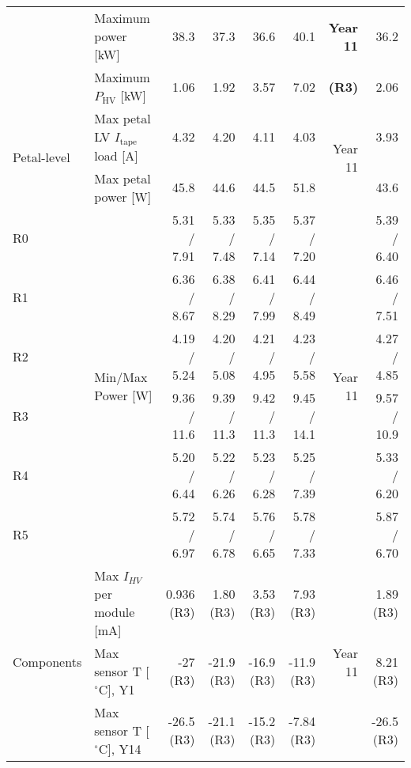 \begin{table}[ht]
\begin{subtable}[t]{.99\linewidth}
\begin{centering}
{\begin{tabular}{|l|l|r|r|r|r|r|r|}
                                & Maximum power [kW]                           &          38.3 &          37.3 &          36.6 &          40.1 & \bf Year 11 &          36.2 \\ 
                                & Maximum $P_\text{HV}$ [kW]                   &          1.06 &          1.92 &          3.57 &          7.02 & \bf (R3)    &          2.06 \\ \hline
\multirow{2}{*}{Petal-level}    & Max petal LV $I_\text{tape}$ load [A]        &          4.32 &          4.20 &          4.11 &          4.03 & \multirow{2}{*}{Year 11} &          3.93 \\ 
                                & Max petal power [W]                          &          45.8 &          44.6 &          44.5 &          51.8 &  &          43.6 \\ \hline
R0                              & \multirow{6}{*}{Min/Max Power [W]}           &   5.31 / 7.91 &   5.33 / 7.48 &   5.35 / 7.14 &   5.37 / 7.20 & \multirow{6}{*}{Year 11} &   5.39 / 6.40 \\ 
R1                              &                                              &   6.36 / 8.67 &   6.38 / 8.29 &   6.41 / 7.99 &   6.44 / 8.49 &  &   6.46 / 7.51 \\ 
R2                              &                                              &   4.19 / 5.24 &   4.20 / 5.08 &   4.21 / 4.95 &   4.23 / 5.58 &  &   4.27 / 4.85 \\ 
R3                              &                                              &   9.36 / 11.6 &   9.39 / 11.3 &   9.42 / 11.3 &   9.45 / 14.1 &  &   9.57 / 10.9 \\ 
R4                              &                                              &   5.20 / 6.44 &   5.22 / 6.26 &   5.23 / 6.28 &   5.25 / 7.39 &  &   5.33 / 6.20 \\ 
R5                              &                                              &   5.72 / 6.97 &   5.74 / 6.78 &   5.76 / 6.65 &   5.78 / 7.33 &  &   5.87 / 6.70 \\ \hline
\multirow{5}{*}{Components}     & Max $I_{HV}$ per module [mA]                 &    0.936 (R3) &     1.80 (R3) &     3.53 (R3) &     7.93 (R3) & \multirow{5}{*}{Year 11} &     1.89 (R3) \\ 
                                & Max sensor T [$^\circ$C], Y1                 &      -27 (R3) &    -21.9 (R3) &    -16.9 (R3) &    -11.9 (R3) &  &     8.21 (R3) \\ 
                                & Max sensor T [$^\circ$C], Y14                &    -26.5 (R3) &    -21.1 (R3) &    -15.2 (R3) &    -7.84 (R3) &  &    -26.5 (R3) \\ 

\end{tabular}}
\end{centering}
\end{subtable}
\end{table}
